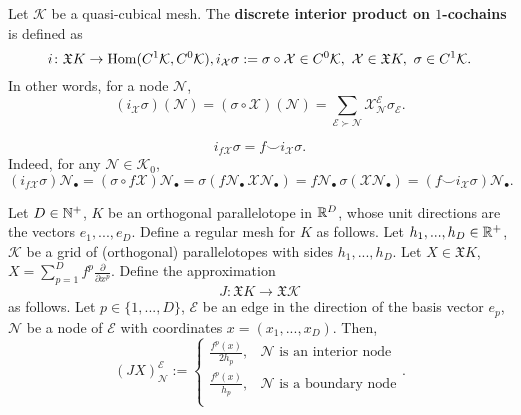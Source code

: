 \begin{definition}
  Let $\mathcal{K}$ be a quasi-cubical mesh.
  The \textbf{discrete interior product on $1$-cochains} is defined as
  \begin{equation}
    i \colon \mathfrak{X} K \to \mathop{\rm Hom}\nolimits(C^1 \mathcal{K}, C^0 \mathcal{K}),
    i_{\mathcal{X}} \sigma := \sigma \circ \mathcal{X} \in C^0 \mathcal{K},\
    \mathcal{X} \in \mathfrak{X} K,\ \sigma \in C^1 \mathcal{K}.
  \end{equation}
  In other words, for a node $\mathcal{N}$,
  \begin{equation}
    (i_{\mathcal{X}} \sigma)(\mathcal{N})
    = (\sigma \circ \mathcal{X})(\mathcal{N})
    = \sum_{\mathcal{E} \succ \mathcal{N}}
      \mathcal{X}^{\mathcal{E}}_{\mathcal{N}} \sigma_{\mathcal{E}}.
  \end{equation}
\end{definition}
\begin{remark}
  \begin{equation}
    i_{f \mathcal{X}} \sigma = f \smile i_\mathcal{X} \sigma.
  \end{equation}
  Indeed, for any $\mathcal{N} \in \mathcal{K}_0$,
  \begin{equation}
    (i_{f \mathcal{X}} \sigma) \mathcal{N}_\bullet
    = (\sigma \circ {f \mathcal{X}}) \mathcal{N}_\bullet
    = \sigma (f \mathcal{N}_\bullet\, \mathcal{X} \mathcal{N}_\bullet)
    = f \mathcal{N}_\bullet\, \sigma(\mathcal{X} \mathcal{N}_\bullet)
    = (f \smile i_\mathcal{X} \sigma) \mathcal{N}_\bullet.
  \end{equation}
\end{remark}
\begin{definition}
  Let
    $D \in \mathbb{N}^+$,
    $K$ be an orthogonal parallelotope in $\mathbb{R}^D$,
    whose unit directions are the vectors $e_1, ..., e_D$.
  Define a regular mesh for $K$ as follows.
  Let
    $h_1, ..., h_D \in \mathbb{R}^+$,
    $\mathcal{K}$ be a grid of (orthogonal) parallelotopes with sides
      $h_1, ..., h_D$.
  Let $X \in \mathfrak{X} K$,
  $X = \sum_{p = 1}^D f^p \frac{\partial}{\partial x^p}$.
  Define the approximation
  \begin{equation}
    J \colon \mathfrak{X} K \to \mathfrak{X} \mathcal{K}
  \end{equation}
  as follows.
  Let $p \in \{1, ..., D\}$,
  $\mathcal{E}$ be an edge in the direction of the basis vector $e_p$,
  $\mathcal{N}$ be a node of $\mathcal{E}$ with coordinates
  $x = (x_1, ..., x_D)$.
  Then,
  \begin{equation}
    (J X)^{\mathcal{E}}_{\mathcal{N}} :=
    \begin{cases}
      \frac{f^p(x)}{2 h_p}, & \text{$\mathcal{N}$ is an interior node} \\
      \frac{f^p(x)}{h_p}, & \text{$\mathcal{N}$ is a boundary node} \\
    \end{cases}.
  \end{equation}
\end{definition}
